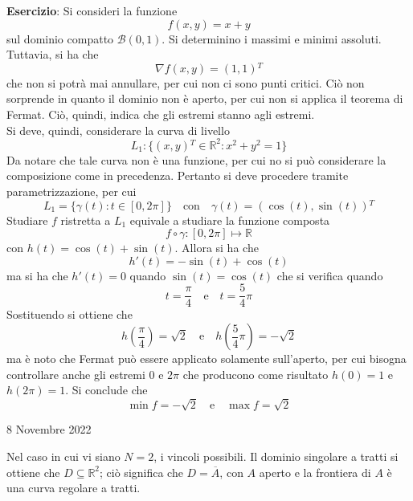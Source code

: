 \documentclass[a4paper]{extarticle}
\begin{document}
\vspace{2em}
\noindent
\textbf{Esercizio}: Si consideri la funzione
\[f(x,y) = x+y\]
sul dominio compatto $\mathcal{B(0,1)}$. Si determinino i massimi e minimi assoluti. Tuttavia, si ha che
\[\nabla f(x,y) = (1,1){^T}\]
che non si potrà mai annullare, per cui non ci sono punti critici. Ciò non sorprende in quanto il dominio non è aperto, per cui non si applica il teorema di Fermat. Ciò, quindi, indica che gli estremi stanno agli estremi.\\
Si deve, quindi, considerare la curva di livello
\[L_1 : \{(x,y){^T} \in \mathbb{R}^2 : x^2+y^2=1\}\]
Da notare che tale curva non è una funzione, per cui no si può considerare la composizione come in precedenza. Pertanto si deve procedere tramite parametrizzazione, per cui
\[L_1 = \{\gamma(t) : t \in [0,2\pi]\}\hspace{1em} \text{con} \hspace{1em} \gamma(t) = (\cos(t),\sin(t)){^T}\]
Studiare $f$ ristretta a $L_1$ equivale a studiare la funzione composta
\[f \circ \gamma : [0,2 \pi] \longmapsto \mathbb{R}\]
con $h(t) = \cos(t) + \sin(t)$. Allora si ha che
\[h'(t) = - \sin(t) + \cos(t)\]
ma si ha che $h'(t) = 0$ quando $\sin(t)=\cos(t)$ che si verifica quando
\[t=\dfrac{\pi}{4} \hspace{1em} \text{e} \hspace{1em} t=\dfrac{5}{4} \pi\]
Sostituendo si ottiene che
\[h \left( \dfrac{\pi}{4}\right) = \sqrt{2} \hspace{1em} \text{e} \hspace{1em} h \left(\dfrac{5}{4} \pi\right) = - \sqrt{2}\]
ma è noto che Fermat può essere applicato solamente sull'aperto, per cui bisogna controllare anche gli estremi $0$ e $2\pi$ che producono come risultato $h(0)=1$ e $h(2\pi)=1$. Si conclude che
\[\min f = - \sqrt{2} \hspace{1em} \text{e} \hspace{1em} \max f = \sqrt{2}\]

\newpage
\noindent
\begin{center}
    8 Novembre 2022
\end{center}
Nel caso in cui vi siano $N=2$, i vincoli possibili. Il dominio singolare a tratti si ottiene che $D \subseteq \mathbb{R}^2$; ciò significa che $D = \overline{A}$, con $A$ aperto e la frontiera di $A$ è una curva regolare a tratti.
\end{document}
